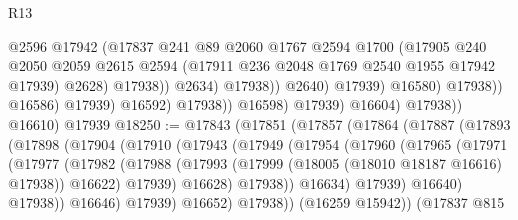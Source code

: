 \begin{lexlean}{R13}
\begin{coremodule}
                                            @2596
                                            @17942
                                            (@17837
                                              @241
                                              @89
                                              @2060
                                              @1767
                                              @2594
                                              @1700
                                              (@17905
                                                @240
                                                @2050
                                                @2059
                                                @2615
                                                @2594
                                                (@17911 @236 @2048 @1769 @2540 @1955 @17942 @17939)
                                                @2628)
                                              @17938))
                                          @2634)
                                        @17938))
                                    @2640)
                                  @17939)
                                @16580)
                              @17938))
                          @16586)
                        @17939)
                      @16592)
                    @17938))
                @16598)
              @17939)
            @16604)
          @17938))
      @16610)
    @17939
@18250 := @17843
    (@17851
      (@17857
        (@17864
          (@17887
            (@17893
              (@17898
                (@17904
                  (@17910
                    (@17943
                      (@17949
                        (@17954
                          (@17960
                            (@17965
                              (@17971
                                (@17977
                                  (@17982
                                    (@17988
                                      (@17993
                                        (@17999 (@18005 (@18010 @18187 @16616) @17938))
                                        @16622)
                                      @17939)
                                    @16628)
                                  @17938))
                              @16634)
                            @17939)
                          @16640)
                        @17938))
                    @16646)
                  @17939)
                @16652)
              @17938))
          (@16259 @15942))
        (@17837
          @815

\end{coremodule}
\end{lexlean}
